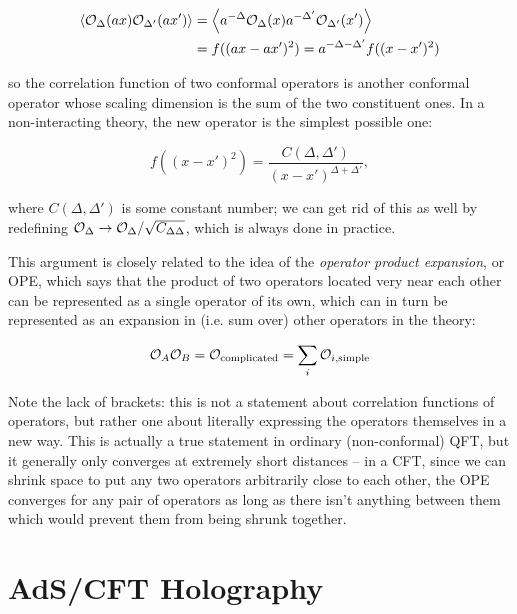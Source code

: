 \begin{align}
    \left \langle {\cal O}_\Delta(ax) {\cal O}_{\Delta'}(ax') \right \rangle
    &= \left \langle a^{-\Delta} {\cal O}_\Delta(x) 
                    a^{-\Delta'} {\cal O}_{\Delta'}(x') \right \rangle \\
    &= f((ax - ax')^2) = a^{-\Delta - \Delta'} f((x - x')^2)
\end{align}

so the correlation function of two conformal operators is another conformal
operator whose scaling dimension is the sum of the two constituent ones. In a 
non-interacting theory, the new operator is the simplest possible one:

\begin{equation}
    f((x - x')^2) = \frac{C(\Delta, \Delta')}{(x - x')^{\Delta + \Delta'}},
\end{equation}

where $C(\Delta, \Delta')$ is some constant number; we can get rid of this as
well by redefining 
${\cal O}_\Delta \to {\cal O}_\Delta / \sqrt{C_{\Delta \Delta}}$, which is 
always done in practice.

This argument is closely related to the idea of the \emph{operator product
expansion}, or OPE, which says that the product of two operators located very
near each other can be represented as a single operator of its own, which can in
turn be represented as an expansion in (i.e. sum over) other operators in the
theory:

\begin{equation}
    {\cal O}_A {\cal O}_B = {\cal O}_\mathrm{complicated} 
    = \sum_i {\cal O}_{i,\mathrm{simple}}
\end{equation}

Note the lack of brackets: this is not a statement about correlation functions
of operators, but rather one about literally expressing the operators themselves
in a new way. This is actually a true statement in ordinary (non-conformal) 
QFT, but it generally only converges at extremely short distances -- in a CFT,
since we can shrink space to put any two operators arbitrarily close to each
other, the OPE converges for any pair of operators as long as there isn't 
anything between them which would prevent them from being shrunk together.

\section{AdS/CFT Holography}
\label{sec:adscft}

